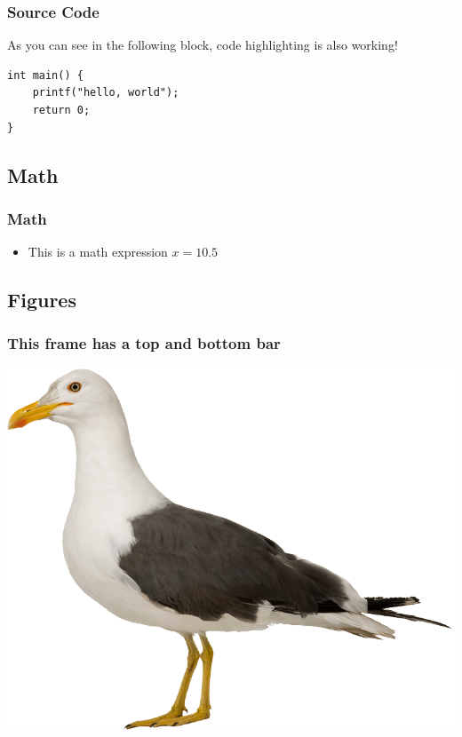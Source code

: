 \documentclass{technical_presentation}
\begin{document}
\begin{frame}[fragile]
	\frametitle{Source Code}
  	
  	 As you can see in the following block, code highlighting is also working!
  	 
  	 \begin{verbatim} 
int main() {
	printf("hello, world");
	return 0;
}
	\end{verbatim}
  	
\end{frame}

\subsection{Math}

\begin{frame}
	\frametitle{Math}

	\begin{itemize}
		\item This is a math expression $x=10.5$
	\end{itemize}

\end{frame}


\subsection{Figures}

\begin{frame}
	\frametitle{This frame has a top and bottom bar}
	\centering
	\includegraphics[height=0.8\textheight]{figures/gull}
\end{frame}
\end{document}

